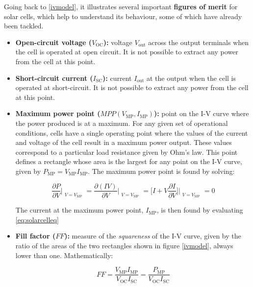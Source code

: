 			
 Going back to \autoref{ivmodel}, it illustrates several important \textbf{figures of merit} for solar cells, which help to understand its behaviour, some of which have already been tackled.

\begin{itemize}

	\item{\textbf{Open-circuit voltage ($V_{\text{OC}}$):} voltage $V_{\text{out}}$ across the output terminals when the cell is operated at open circuit. It is not possible to extract any power from the cell at this point.}

	\item{\textbf{Short-circuit current ($ I_{\text{SC}}$):} current $ I_{\text{out}} $ at the output when the cell is operated at short-circuit. It is not possible to extract any power from the cell at this point.}
	
	\item{\textbf{Maximum power point ($MPP (V_{\text{MP}},I_{\text{MP}})$):} point on the I-V curve where the power produced is at a maximum. For any given set of operational conditions, cells have a single operating point where the values of the current and voltage of the cell result in a maximum power output. These values correspond to a particular load resistance given by Ohm's law. This point defines a rectangle whose area is the largest for any point on the I-V curve, given by $P_{\text{MP}}=V_{\text{MP}}I_{\text{MP}}$.} The maximum power point is found by solving: \cite{photovoltaichandbook}
	

			\begin{equation} 
				\frac{\partial P}{\partial V}\Bigr|_{\substack{V=V_{\text{MP}}}}=\frac{\partial (IV)}{\partial V}\Bigr|_{\substack{V=V_{\text{MP}}}}=\Big[ I+V\frac{\partial I}{\partial V}\Big]\Bigr|_{\substack{V=V_{\text{MP}}}}=0
			\label{mppequation}
			\end{equation}
			
			The current at the maximum power point, $I_{\text{MP}}$, is then found by evaluating \autoref{eq:solarcelleq}

	\item{\textbf{Fill factor ($FF$):} measure of the \textit{squareness} of the I-V curve, given by the ratio of the areas of the two rectangles shown in figure \autoref{ivmodel}, always lower than one. Mathematically:}
	
		\begin{equation} \label{fillfactorequation}
			FF=\frac{V_{\text{MP}}I_{\text{MP}}}{V_{\text{OC}}I_{\text{SC}}}=\frac{P_{\text{MP}}}{V_{\text{OC}}I_{\text{SC}}}
	\end{equation}
	

\end{itemize}
